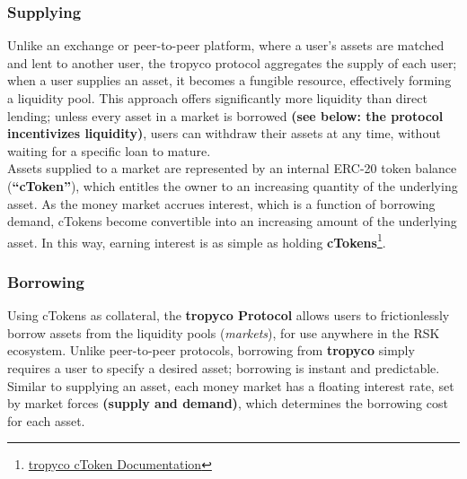 \documentclass{article}
\begin{document}
\subsubsection{Supplying}
Unlike an exchange or peer-to-peer platform, where a user's assets are matched and lent to another
user, the tropyco protocol aggregates the supply of each user; when a user supplies an asset, it
becomes a fungible resource, effectively forming a liquidity pool. This approach offers significantly more liquidity than direct lending; unless every asset in a market is borrowed \textbf{(see below: the protocol incentivizes liquidity)}, users can withdraw their assets at any time, without waiting for a specific loan to mature.
\\
Assets supplied to a market are represented by an internal ERC-20 token balance (\textbf{“cToken”}), which entitles the owner to an increasing quantity of the underlying asset. As the money market accrues interest, which is a function of borrowing demand, cTokens become convertible into an increasing amount of the underlying asset. In this way, earning interest is as simple as holding \textbf{cTokens}\footnote{\href{https://test.tropyco.app/doc/keyConcepts\#ctokens}{tropyco cToken Documentation}}.

\subsubsection{Borrowing}

Using cTokens as collateral, the \textbf{tropyco Protocol} allows users to frictionlessly borrow assets from the liquidity pools (\textit{markets}), for use anywhere in the RSK ecosystem. Unlike peer-to-peer protocols, borrowing from \textbf{tropyco} simply requires a user to specify a desired asset; borrowing is instant and predictable. Similar to supplying an asset, each money market has a floating interest rate, set by market forces \textbf{(supply and demand)}, which determines the borrowing cost for each asset.

\end{document}
